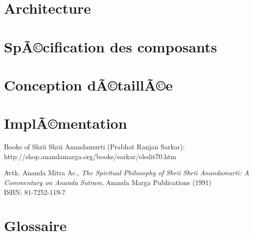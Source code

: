 \documentclass[a4paper, french, 10pt]{report}
\begin{document}
\chapter{Architecture}
 
 
\chapter{SpÃ©cification des composants}
 
 
\chapter{Conception dÃ©taillÃ©e}
 
 
\chapter{ImplÃ©mentation}
 


\begin{thebibliography}{99}
  
Books of Shrii Shrii Anandamurti (Prabhat Ranjan Sarkar): \\
http://shop.anandamarga.org/books/sarkar/eledit70.htm
 
Avtk. Ananda Mitra Ac., \emph{The Spiritual Philosophy of Shrii Shrii Anandamurti: A Commentary on Ananda Sutram}, Ananda Marga Publications (1991) \\
ISBN: 81-7252-119-7
 
\end{thebibliography}
  
\appendix
\chapter{Glossaire}
\end{document}
